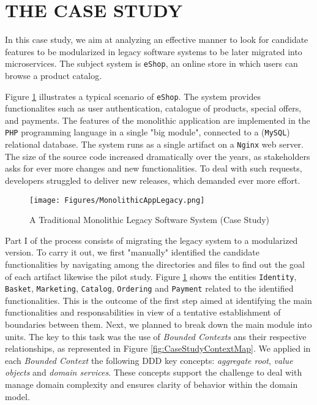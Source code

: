 \documentclass[a4paper,twoside]{article}
\begin{document}
\section{\uppercase{The Case Study}}
\label{sec:theCaseStudy}

\noindent In this case study, we aim at analyzing an effective manner to look for candidate features to be modularized in legacy software systems to be later migrated into microservices. The subject system is \texttt{eShop}, an online store in which users can browse a product catalog.

Figure \ref{fig:MonolithicApp} illustrates a typical scenario of \texttt{eShop}. The system provides functionalites such as user authentication, catalogue of products, special offers, and payments. The features of the monolithic application are implemented in the \texttt{PHP} programming language in a single "big module", connected to a (\texttt{MySQL}) relational database. The system runs as a single artifact on a \texttt{Nginx} web server. The size of the source code increased dramatically over the years, as stakeholders asks for ever more changes and new functionalities. To deal with such requests, developers struggled to deliver new releases, which demanded ever more effort.

\begin{figure}
\centering
\texttt{[image: Figures/MonolithicAppLegacy.png]}
\caption{A Traditional Monolithic Legacy Software System (Case Study) \cite{henriqueITNG2019expReport}}
\label{fig:MonolithicApp}
\end{figure}

Part I of the process consists of migrating the legacy system to a modularized version. To carry it out, we first "manually" identified the candidate functionalities by navigating among the directories and files to find out the goal of each artifact likewise the pilot study. Figure \ref{fig:MonolithicApp} shows the entities \texttt{Identity}, \texttt{Basket}, \texttt{Marketing}, \texttt{Catalog}, \texttt{Ordering} and \texttt{Payment} related to the identified functionalities. This is the outcome of the first step aimed at identifying the main functionalities and responsabilities in view of a tentative establishment of boundaries between them. Next, we planned to break down the main module into units. The key to this task was the use of \textit{Bounded Contexts} ans their respective relationships, as represented in Figure \ref{fig:CaseStudyContextMap}. We applied in each \textit{Bounded Context} the following DDD key concepts: \textit{aggregate root}, \textit{value objects} and \textit{domain services}. These concepts support the challenge to deal with manage domain complexity and ensures clarity of behavior within the domain model.
\end{document}
